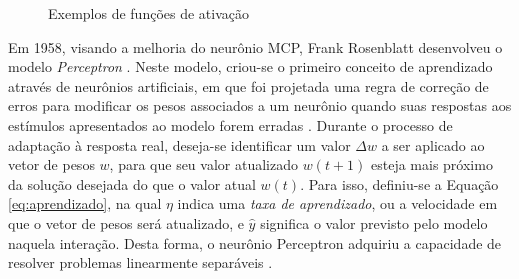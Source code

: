 \begin{figure}[h!]
     \hfill
     \hfill
     \hfill
     \caption{Exemplos de funções de ativação \cite{goodfellow}}
     \label{fig:activation}
\end{figure}


Em 1958, visando a melhoria do neurônio MCP, Frank Rosenblatt desenvolveu o modelo \emph{Perceptron} \cite{Rosenblatt}. Neste modelo, criou-se o primeiro conceito de aprendizado através de neurônios artificiais, em que foi projetada uma regra de correção de erros para modificar os pesos associados a um neurônio quando suas respostas aos estímulos apresentados ao modelo forem erradas \cite{arbib}. Durante o processo de adaptação à resposta real, deseja-se identificar um valor $\Delta w$ a ser aplicado ao vetor de pesos $w$, para que seu valor atualizado $w(t+1)$ esteja mais próximo da solução desejada do que o valor atual $w(t)$. Para isso, definiu-se a Equação \ref{eq:aprendizado}, na qual $\eta$ indica uma \emph{taxa de aprendizado}, ou a velocidade em que o vetor de pesos será atualizado, e $\hat{y}$ significa o valor previsto pelo modelo naquela interação. Desta forma, o neurônio Perceptron adquiriu a capacidade de resolver problemas linearmente separáveis \cite{braga}.

